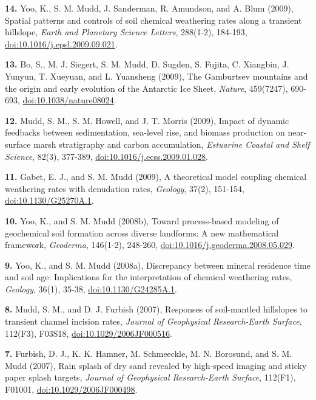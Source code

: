 \documentclass[10pt, a4paper]{article}
\newcommand{\years}[1]{\marginnote{\scriptsize #1}}
\begin{document}
\years{2009}\hangindent=0.7cm\textbf{14.} Yoo, K., S. M. Mudd, J. Sanderman, R. Amundson, and A. Blum (2009), Spatial patterns and controls of soil chemical weathering rates along a transient hillslope, \textit{Earth and Planetary Science Letters}, 288(1-2), 184-193, \href{http://dx.doi.org/doi:10.1016/j.epsl.2009.09.021}{doi:10.1016/j.epsl.2009.09.021}.\par
\hangindent=0.7cm\textbf{13.} Bo, S., M. J. Siegert, S. M. Mudd, D. Sugden, S. Fujita, C. Xiangbin, J. Yunyun, T. Xueyuan, and L. Yuansheng (2009), The Gamburtsev mountains and the origin and early evolution of the Antarctic Ice Sheet, \textit{Nature}, 459(7247), 690-693, \href{http://dx.doi.org/doi:10.1038/nature08024}{doi:10.1038/nature08024}.\par
\hangindent=0.7cm\textbf{12.} Mudd, S. M., S. M. Howell, and J. T. Morris (2009), Impact of dynamic feedbacks between sedimentation, sea-level rise, and biomass production on near-surface marsh stratigraphy and carbon accumulation, \textit{Estuarine Coastal and Shelf Science}, 82(3), 377-389, \href{http://dx.doi.org/doi:10.1016/j.ecss.2009.01.028}{doi:10.1016/j.ecss.2009.01.028}.\par
\hangindent=0.7cm\textbf{11.} Gabet, E. J., and S. M. Mudd (2009), A theoretical model coupling chemical weathering rates with denudation rates, \textit{Geology}, 37(2), 151-154, \href{http://dx.doi.org/doi:10.1130/G25270A.1}{doi:10.1130/G25270A.1}.\par

\years{2008}\hangindent=0.7cm\textbf{10.} Yoo, K., and S. M. Mudd (2008b), Toward process-based modeling of geochemical soil formation across diverse landforms: A new mathematical framework, \textit{Geoderma}, 146(1-2), 248-260, \href{http://dx.doi.org/doi:10.1016/j.geoderma.2008.05.029}{doi:10.1016/j.geoderma.2008.05.029}.\par
\hangindent=0.7cm\textbf{9.} Yoo, K., and S. M. Mudd (2008a), Discrepancy between mineral residence time and soil age: Implications for the interpretation of chemical weathering rates, \textit{Geology}, 36(1), 35-38, \href{http://dx.doi.org/doi:10.1130/G24285A.1}{doi:10.1130/G24285A.1}.\par

\years{2007}
\hangindent=0.7cm\textbf{8.} Mudd, S. M., and D. J. Furbish (2007), Responses of soil-mantled hillslopes to transient channel incision rates, \textit{Journal of Geophysical Research-Earth Surface}, 112(F3), F03S18, \href{http://dx.doi.org/doi:10.1029/2006JF000516}{doi:10.1029/2006JF000516}.\par
\hangindent=0.7cm\textbf{7.} Furbish, D. J., K. K. Hamner, M. Schmeeckle, M. N. Borosund, and S. M. Mudd (2007), Rain splash of dry sand revealed by high-speed imaging and sticky paper splash targets, \textit{Journal of Geophysical Research-Earth Surface}, 112(F1), F01001, \href{http://dx.doi.org/doi:10.1029/2006JF000498}{doi:10.1029/2006JF000498}.\par
\end{document}
